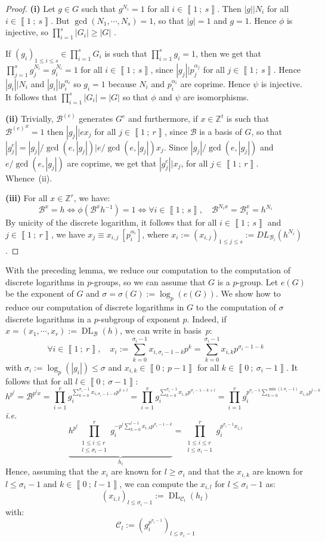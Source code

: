 \documentclass[a4paper,10pt]{report}
\theoremstyle{definition}
\theoremstyle{plain}
\theoremstyle{definition}
\newcommand{\ie}{\emph{i.e.}\ }
\newcommand{\Z}{\mathbb{Z}}
\newcommand{\m}[1]{\mathcal{#1}}
\newcommand{\mC}{\mathcal{C}}
\renewcommand{\i}[2]{\left\llbracket #1~;~#2\right\rrbracket}
\renewcommand{\(}{\left(}
\renewcommand{\)}{\right)}
\DeclareMathOperator{\DL}{DL}
\begin{document}
\begin{proof}
\textbf{(i)} Let $g\in G$ such that $g^{N_i}=1$ for all $i\in\i{1}{s}$. Then $|g||N_i$ for all $i\in\i{1}{s}$. But $\gcd(N_1,\cdots, N_s)=1$, so that $|g|=1$ and $g=1$. Hence $\phi$ is injective, so $\prod_{i=1}^s|G_i|\geq |G|$ .

If $(g_i)_{1\leq i\leq s} \in  \prod_{i=1}^s G_i$ is such that $\prod_{i=1}^s g_i=1$, then we get that $\prod_{j=1}^s g_j^{N_i}=g_i^{N_i}=1$ for all $i\in\i{1}{s}$,  since $|g_j||p_j^{\alpha_j}$ for all $j\in\i{1}{s}$.  Hence $|g_i||N_i$ and $|g_i||p_i^{\alpha_i}$ so $g_i=1$ because $N_i$ and $p_i^{\alpha_i}$ are coprime. Hence $\psi$ is injective. It follows that $\prod_{i=1}^s|G_i|=|G|$ so that $\phi$ and $\psi$ are isomorphisms.  

\textbf{(ii)} Trivially, $\m{B}^{(e)}$ generates $G^e$ and furthermore, if $x\in\Z^t$ is such that ${\m{B}^{(e)}}^x=1$ then $|g_j||e x_j$ for all $j\in\i{1}{r}$, since $\m{B}$ is a basis of $G$, so that $|g_j^{e}|=|g_j|/\gcd(e,|g_j|)|e/\gcd(e,|g_j|)x_j$. Since $|g_j|/\gcd(e,|g_j|)$ and $e/\gcd(e,|g_j|)$ are coprime, we get that $|g_j^{e}||x_j$, for all $j\in\i{1}{r}$. Whence~(ii).

\textbf{(iii)} For all $x\in\Z^r$, we have:
\[\m{B}^x=h\Longleftrightarrow \phi(\m{B}^xh^{-1})=1\Longleftrightarrow \forall i\in\i{1}{s}, \quad \m{B}^{N_i x}=\m{B}_i^x=h^{N_i}\]
By unicity of the discrete logarithm, it follows that for all $i\in\i{1}{s}$ and $j\in\i{1}{r}$, we have $x_j\equiv x_{i,j}\ [p_i^{\alpha_i}]$, where $x_i:=(x_{i,j})_{1\leq j\leq s}:=DL_{\m{B}_i}(h^{N_i})$. 
\end{proof}

With the preceding lemma, we reduce our computation to the computation of discrete logarithms in $p$-groups, so we can assume that $G$ is a $p$-group.  Let $e(G)$ be the exponent of $G$ and $\sigma=\sigma(G):=\log_p(e(G))$. We show how to reduce our computation of discrete logarithms in $G$ to the computation of $\sigma$ discrete logarithms in a $p$-subgroup of exponent $p$.  Indeed, if $x=(x_1,\cdots, x_r):=\DL_{\m{B}}(h)$, we can write in basis~$p$:
\[\forall i\in\i{1}{r}, \quad x_i:=\sum_{k=0}^{\sigma_i-1}x_{i,\sigma_i-1-k} p^k=\sum_{k=0}^{\sigma_i-1}x_{i,k} p^{\sigma_i-1-k}\]
with $\sigma_i:=\log_p(|g_i|)\leq \sigma$ and $x_{i,k}\in\i{0}{p-1}$ for all $k\in\i{0}{\sigma_i-1}$.  It follows that for all $l\in\i{0}{\sigma-1}$:
\[h^{p^{l}}=\m{B}^{p^l x}=\prod_{i=1}^r g_i^{\sum_{k=0}^{\sigma_i-1}x_{i,\sigma_i-1-k} p^{k+l}}=\prod_{i=1}^r g_i^{\sum_{k=0}^{\sigma_i-1}x_{i,k} p^{\sigma_i-1-k+l}}=\prod_{i=1}^r g_i^{p^{\sigma_i-1}\sum_{k=0}^{\min(l,\sigma_i-1)}x_{i,k} p^{l-k}}\]
\ie
\[\underbrace{h^{p^{l}}\prod_{\substack{1\leq i\leq r\\ l\leq \sigma_i-1}}^r g_i^{-p^l\sum_{k=0}^{l-1}x_{i,k}p^{\sigma_i-1-k}}}_{h_l}=\prod_{\substack{1\leq i\leq r\\ l\leq \sigma_i-1}}^r g_i^{p^{\sigma_i-1}x_{i,l}}\]
Hence, assuming that the $x_i$ are known for $l\geq \sigma_i$ and that the $x_{i,k}$ are known for $l\leq \sigma_i-1$ and $k\in\i{0}{l-1}$, we can compute the $x_{i,l}$ for $l\leq \sigma_i-1$ as:
\[(x_{i,l})_{ l\leq \sigma_i-1}:=\DL_{\mC_l}(h_l)\]
with:
\[\mC_l:=(g_i^{p^{\sigma_i-1}})_{ l\leq \sigma_i-1}\] 
\end{document}
